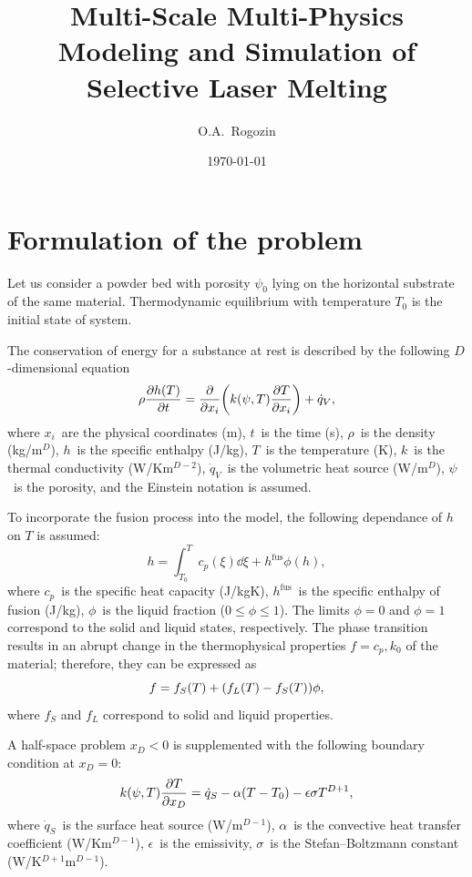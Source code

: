 \documentclass{article}
\title{Multi-Scale Multi-Physics Modeling and Simulation of Selective Laser Melting}
\date{\today}
\author{O.A.~Rogozin} %
\newcommand{\fusion}[1]{{#1}^\mathrm{fus}}
\begin{document}
\maketitle
\tableofcontents

\section{Formulation of the problem}\label{sec:formulation}

Let us consider a powder bed with porosity \(\psi_0\) lying on the horizontal substrate of the same material.
Thermodynamic equilibrium with temperature \(T_0\) is the initial state of system.

The conservation of energy for a substance at rest is described by the following \(D\)-dimensional equation
\begin{equation}\label{eq:heat_conduction}
    \rho\pdv{h(T)}{t} = \pdv{x_i}\qty( k(\psi,T)\pdv{T}{x_i} ) + \dot{q}_V,
\end{equation}
where \(x_i\)~are the physical coordinates (\si{m}), \(t\)~is the time (\si{s}),
\(\rho\)~is the density (\si{kg/m}\(^D\)), \(h\)~is the specific enthalpy (\si{J/kg}),
\(T\)~is the temperature (\si{\K}), \(k\)~is the thermal conductivity (\si{W/Km}\(^{D-2}\)),
\(\dot{q}_V\)~is the volumetric heat source (\si{W/m}\(^D\)), \(\psi\)~is the porosity,
and the Einstein notation is assumed.

To incorporate the fusion process into the model, the following dependance of \(h\) on \(T\) is assumed:
\begin{equation}\label{eq:enthalpy}
    h = \int_{T_0}^T c_p(\xi)\dd{\xi} + \fusion{h}\phi(h),
\end{equation}
where \(c_p\)~is the specific heat capacity (\si{J/kgK}), \(\fusion{h}\)~is the specific enthalpy of fusion (\si{J/kg}),
\(\phi\)~is the liquid fraction (\(0 \leq \phi \leq 1\)).
The limits \(\phi=0\) and \(\phi=1\) correspond to the solid and liquid states, respectively.
The phase transition results in an abrupt change in the thermophysical properties \(f=c_p,k_0\) of the material;
therefore, they can be expressed as
\begin{equation}\label{eq:fusion_change}
    f = f_S(T) + \qty( f_L(T) - f_S(T) )\phi,
\end{equation}
where \(f_S\) and \(f_L\) correspond to solid and liquid properties.

A half-space problem \(x_D<0\) is supplemented with the following boundary condition at \(x_D=0\):
\begin{equation}\label{eq:bc}
    k(\psi,T)\pdv{T}{x_D} = \dot{q}_S - \alpha(T-T_0) - \epsilon\sigma T^{D+1},
\end{equation}
where \(\dot{q}_S\)~is the surface heat source (\si{W/m}\(^{D-1}\)),
\(\alpha\)~is the convective heat transfer coefficient (\si{W/Km}\(^{D-1}\)),
\(\epsilon\)~is the emissivity, \(\sigma\)~is the Stefan--Boltzmann constant (\si{W/K}\(^{D+1}\)\si{m}\(^{D-1}\)).
\end{document}
